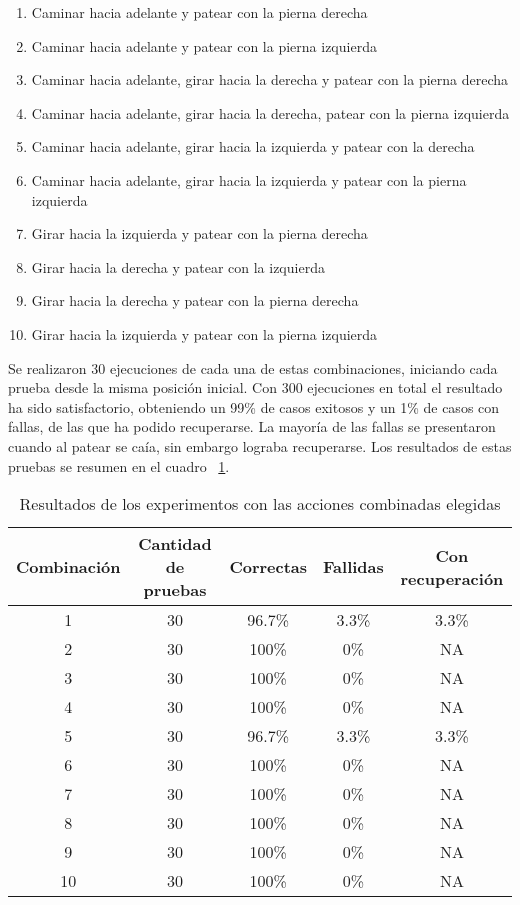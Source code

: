 \begin{enumerate}
\setlength{\itemsep}{0pt}
\item Caminar hacia adelante y patear con la pierna derecha 
\item Caminar hacia adelante y patear con la pierna izquierda
\item Caminar hacia adelante, girar hacia la derecha y patear con la pierna derecha
\item Caminar hacia adelante, girar hacia la derecha, patear con la pierna izquierda 
\item Caminar hacia adelante, girar hacia la izquierda y patear con la derecha
\item Caminar hacia adelante, girar hacia la  izquierda y  patear con la pierna izquierda
\item Girar hacia la izquierda y patear con la pierna derecha
\item Girar hacia la derecha y patear con la izquierda
\item Girar hacia la derecha y patear con la pierna derecha
\item Girar hacia la izquierda y patear con la pierna izquierda

\end{enumerate}
Se realizaron 30 ejecuciones de cada una de estas combinaciones, iniciando cada prueba desde la misma posición inicial. Con 300 ejecuciones en total el resultado ha sido satisfactorio, obteniendo un 99\% de casos exitosos y un 1\% de casos con fallas, de las que ha podido recuperarse. La mayoría de las fallas se presentaron cuando al patear se caía, sin embargo lograba recuperarse. Los resultados de estas pruebas se resumen en el cuadro ~\ref{fig:combinadas}.
 
\begin{table}
\centering
\begin{tabular}{c c c c c}
\hline 
Combinaci\'on & Cantidad de pruebas & Correctas & Fallidas & Con recuperaci\'on \\ 
\hline 
1 & 30 & 96.7\% & 3.3\% & 3.3\% \\ 
2 & 30 & 100\% & 0\% & NA \\ 
3 & 30 & 100\% & 0\% & NA \\ 
4 & 30 & 100\% & 0\% & NA \\ 
5 & 30 & 96.7\% & 3.3\% & 3.3\% \\ 
6 & 30 & 100\% & 0\% & NA \\ 
7 & 30 & 100\% & 0\% & NA \\ 
8 & 30 & 100\% & 0\% & NA \\ 
9 & 30 & 100\% & 0\% & NA \\ 
10 & 30 & 100\% & 0\% & NA \\ 
\hline 
\end{tabular} 
\caption{Resultados de los experimentos con las acciones combinadas elegidas}
\label{fig:combinadas}
\end{table}

